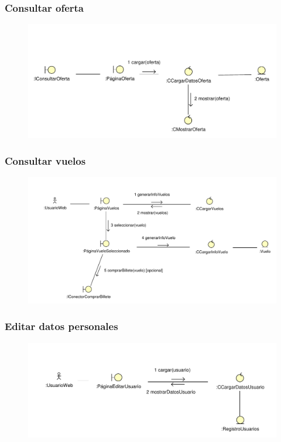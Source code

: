 \documentclass[11pt, a4paper, twoside, titlepage]{article}
\begin{document}
			\subsubsection{Consultar oferta}
				\begin{figure}[H]\centering
					\includegraphics[scale=.85]{diagramas/consultaroferta.pdf}
				\end{figure}

			\subsubsection{Consultar vuelos}
				\begin{figure}[H]\centering
					\includegraphics[scale=.71]{diagramas/consultarvuelos.pdf}
				\end{figure}
			
			\subsubsection{Editar datos personales}
				\begin{figure}[H]\centering
					\includegraphics[scale=.86]{diagramas/editardatospersonales.pdf}
				\end{figure}
\end{document}
